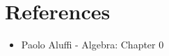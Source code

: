 \newpage
\section*{References}
\begin{itemize}
    \item Paolo Aluffi - Algebra: Chapter 0
\end{itemize}